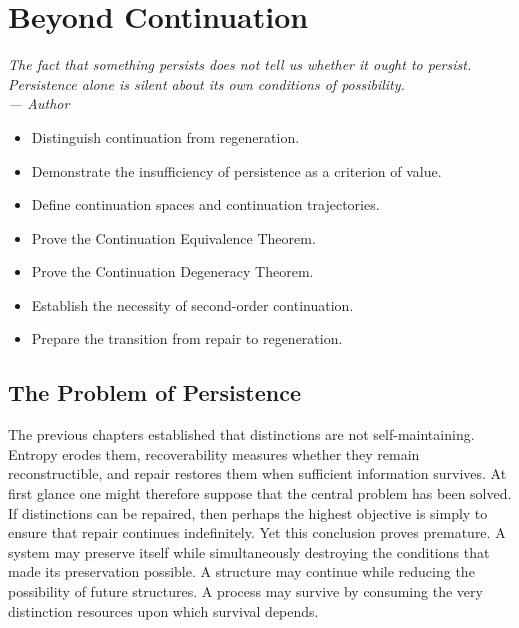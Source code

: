 \documentclass[12pt,twoside,openright]{book}
\newenvironment{epigraph}[2]{%
  \vspace{1em}\begin{flushright}
  \begin{minipage}{0.72\textwidth}
  \itshape\small #1\\[0.4em]
  \upshape\footnotesize\sffamily\color{DistGray}--- #2
  \end{minipage}\end{flushright}\vspace{1.5em}}{}
\newenvironment{objectives}{%
  \begin{tcolorbox}[colback=DistBlue!5,colframe=DistBlue,
    title={\faCheckCircle\enspace Learning Objectives},
    fonttitle=\sffamily\bfseries\color{white},
    attach boxed title to top left={yshift=-2mm,xshift=4mm},
    boxed title style={colback=DistBlue},breakable]
  \begin{itemize}[leftmargin=*,nosep]}{%
  \end{itemize}\end{tcolorbox}\vspace{1em}}
\begin{document}

\chapter{Beyond Continuation}
\label{ch:beyond-continuation}

\begin{epigraph}{The fact that something persists does not
  tell us whether it ought to persist. Persistence alone is
  silent about its own conditions of possibility.}%
  {Author}
\end{epigraph}

\begin{objectives}
  \item Distinguish continuation from regeneration.
  \item Demonstrate the insufficiency of persistence as a
        criterion of value.
  \item Define continuation spaces and continuation
        trajectories.
  \item Prove the Continuation Equivalence Theorem.
  \item Prove the Continuation Degeneracy Theorem.
  \item Establish the necessity of second-order continuation.
  \item Prepare the transition from repair to regeneration.
\end{objectives}

\section{The Problem of Persistence}
\label{sec:ch10-persistence}

The previous chapters established that distinctions are not
self-maintaining. Entropy erodes them, recoverability
measures whether they remain reconstructible, and repair
restores them when sufficient information survives. At
first glance one might therefore suppose that the central
problem has been solved. If distinctions can be repaired,
then perhaps the highest objective is simply to ensure that
repair continues indefinitely. Yet this conclusion proves
premature. A system may preserve itself while
simultaneously destroying the conditions that made its
preservation possible. A structure may continue while
reducing the possibility of future structures. A process
may survive by consuming the very distinction resources
upon which survival depends.
\end{document}
